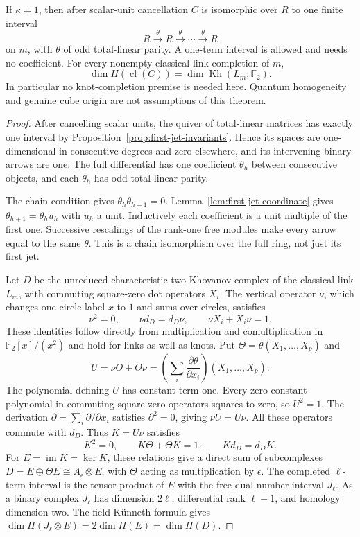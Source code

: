 \begin{theorem}
\label{thm:first-jet-rigidity}
If $\kappa=1$, then after scalar-unit cancellation $C$ is isomorphic
over $R$ to one finite interval
\[
 R\xrightarrow{\theta}R\xrightarrow{\theta}\cdots
 \xrightarrow{\theta}R
\]
on $m$, with $\theta$ of odd total-linear parity. A one-term interval
is allowed and needs no coefficient. For every nonempty classical link
completion of $m$,
\begin{equation}
 \dim H(\operatorname{cl}(C))
 =\dim\operatorname{Kh}(L_m;\mathbb F_2).
 \label{eq:first-jet-all-link-equality}
\end{equation}
In particular no knot-completion premise is needed here. Quantum
homogeneity and genuine cube origin are not assumptions of this theorem.
\end{theorem}

\begin{proof}
After cancelling scalar units, the quiver of total-linear matrices has
exactly one interval by Proposition~\ref{prop:first-jet-invariants}.
Hence its spaces are one-dimensional in consecutive degrees and zero
elsewhere, and its intervening binary arrows are one.
The full differential has one coefficient $\theta_h$ between consecutive
objects, and each $\theta_h$ has odd total-linear parity.

The chain condition gives $\theta_h\theta_{h+1}=0$.
Lemma~\ref{lem:first-jet-coordinate} gives
$\theta_{h+1}=\theta_hu_h$ with $u_h$ a unit. Inductively each coefficient
is a unit multiple of the first one. Successive rescalings of the
rank-one free modules make every arrow equal to the same $\theta$.
This is a chain isomorphism over the full ring, not just its first jet.

Let $D$ be the unreduced characteristic-two Khovanov complex of the
classical link $L_m$, with commuting square-zero dot operators $X_i$.
The vertical operator $\nu$, which changes one circle label $x$ to $1$
and sums over circles, satisfies
\[
 \nu^2=0,\qquad \nu d_D=d_D\nu,\qquad \nu X_i+X_i\nu=1.
\]
These identities follow directly from multiplication and comultiplication
in $\mathbb F_2[x]/(x^2)$ and hold for links as well as knots. Put
$\Theta=\theta(X_1,\ldots,X_p)$ and
\[
 U=\nu\Theta+\Theta\nu
 =\left(\sum_i\frac{\partial\theta}{\partial x_i}\right)(X_1,\ldots,X_p).
\]
The polynomial defining $U$ has constant term one. Every zero-constant
polynomial in commuting square-zero operators squares to zero, so $U^2=1$.
The derivation $\partial=\sum_i\partial/\partial x_i$ satisfies
$\partial^2=0$, giving $\nu U=U\nu$.
All these operators commute with $d_D$. Thus $K=U\nu$ satisfies
\[
 K^2=0,\qquad K\Theta+\Theta K=1,\qquad Kd_D=d_DK.
\]
For $E=\operatorname{im}K=\ker K$, these relations give a direct sum
of subcomplexes
$D=E\oplus\Theta E\cong A_\epsilon\otimes E$, with $\Theta$ acting
as multiplication by $\epsilon$.
The completed $\ell$-term interval is the tensor product of $E$ with
the free dual-number interval $J_\ell$. As a binary complex $J_\ell$
has dimension $2\ell$, differential rank $\ell-1$, and homology
dimension two. The field K\"unneth formula gives
$\dim H(J_\ell\otimes E)=2\dim H(E)=\dim H(D)$.
\end{proof}

